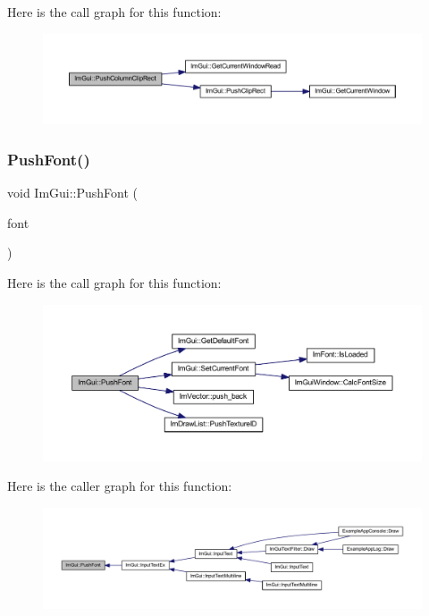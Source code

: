 Here is the call graph for this function\+:
\nopagebreak
\begin{figure}[H]
\begin{center}
\leavevmode
\includegraphics[width=350pt]{namespace_im_gui_abb20c9f8365cab62d9394ebb1dd5d769_cgraph}
\end{center}
\end{figure}
\mbox{\label{namespace_im_gui_ac5a59f4f8226fd35786d8973c85b85a9}} 
\subsubsection{\texorpdfstring{Push\+Font()}{PushFont()}}
{\footnotesize\ttfamily void Im\+Gui\+::\+Push\+Font (\begin{DoxyParamCaption}\item[{\mbox{\hyperlink{struct_im_font}{Im\+Font}} $\ast$}]{font }\end{DoxyParamCaption})}

Here is the call graph for this function\+:
\nopagebreak
\begin{figure}[H]
\begin{center}
\leavevmode
\includegraphics[width=350pt]{namespace_im_gui_ac5a59f4f8226fd35786d8973c85b85a9_cgraph}
\end{center}
\end{figure}
Here is the caller graph for this function\+:
\nopagebreak
\begin{figure}[H]
\begin{center}
\leavevmode
\includegraphics[width=350pt]{namespace_im_gui_ac5a59f4f8226fd35786d8973c85b85a9_icgraph}
\end{center}
\end{figure}
\mbox{\label{namespace_im_gui_a27a8533605dc5b8cabf161bf7715bbde}} 
